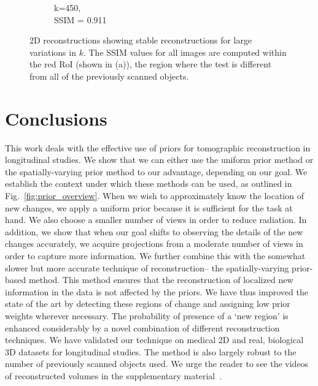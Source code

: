 \documentclass[journal]{IEEEtran}
\begin{document}
\begin{figure}[h]
\begin{subfigure}[b]{0.24\linewidth}
        \caption{k=450,\\ SSIM = 0.911}
     \end{subfigure}
    \caption{2D reconstructions showing stable reconstructions for large variations in $k$. The SSIM values for all images are computed within the red RoI (shown in (a)), the region where the test is different from all of the previously scanned objects.}
\label{fig:reconstructions_as_k_varies}
\end{figure}


\section{Conclusions}
\label{sec:conclusions}
This work deals with the effective use of priors for tomographic
reconstruction in longitudinal studies. We show that we can either use
the uniform prior method or the spatially-varying prior method to our
advantage, depending on our goal. We establish the context under which
these methods can be used, as outlined in
Fig.~\ref{fig:prior_overview}. When we wish to approximately know the
location of new changes, we apply a uniform prior because it is
sufficient for the task at hand. We also choose a smaller number
of views in order to reduce radiation. In addition, we show that when
our goal shifts to observing the details of the new changes
accurately, we acquire projections from a moderate number of views in
order to capture more information. We further combine this with the
somewhat slower but more accurate technique of reconstruction-- the
spatially-varying prior-based method. This method ensures that the
reconstruction of localized new information in the data is not
affected by the priors. %
We have thus
improved the state of the art by detecting these regions of change and
assigning low prior weights wherever necessary. The probability of
presence of a `new region' is enhanced considerably by a novel
combination of different reconstruction techniques.  We have validated
our technique on medical 2D and real, biological 3D datasets for
longitudinal studies. The method is also largely robust to the number
of previously scanned objects used. We urge the reader to see the
videos of reconstructed volumes in the supplementary
material~\cite{supp_paper}.
\end{document}
